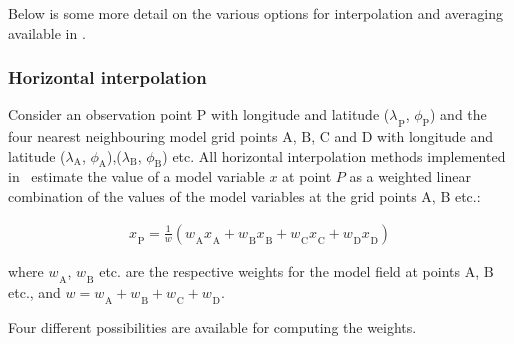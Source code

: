 \documentclass[../main/NEMO_manual]{subfiles}
\begin{document}
Below is some more detail on the various options for interpolation and averaging available in \NEMO.

\subsubsection{Horizontal interpolation}

Consider an observation point ${\mathrm P}$ with longitude and latitude (${\lambda_{}}_{\mathrm P}$, $\phi_{\mathrm P}$) and
the four nearest neighbouring model grid points ${\mathrm A}$, ${\mathrm B}$, ${\mathrm C}$ and ${\mathrm D}$ with
longitude and latitude ($\lambda_{\mathrm A}$, $\phi_{\mathrm A}$),($\lambda_{\mathrm B}$, $\phi_{\mathrm B}$) etc.
All horizontal interpolation methods implemented in \NEMO\ estimate the value of a model variable $x$ at point $P$ as
a weighted linear combination of the values of the model variables at the grid points ${\mathrm A}$, ${\mathrm B}$ etc.:

\begin{align*}
  {x_{}}_{\mathrm P} =
\frac{1}{w} \left( {w_{}}_{\mathrm A} {x_{}}_{\mathrm A} +
{w_{}}_{\mathrm B} {x_{}}_{\mathrm B} +
{w_{}}_{\mathrm C} {x_{}}_{\mathrm C} +
{w_{}}_{\mathrm D} {x_{}}_{\mathrm D} \right)
\end{align*}

where ${w_{}}_{\mathrm A}$, ${w_{}}_{\mathrm B}$ etc. are the respective weights for the model field at
points ${\mathrm A}$, ${\mathrm B}$ etc., and $w = {w_{}}_{\mathrm A} + {w_{}}_{\mathrm B} + {w_{}}_{\mathrm C} + {w_{}}_{\mathrm D}$.

Four different possibilities are available for computing the weights.
\end{document}
